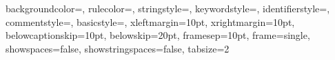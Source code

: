 \setlength{\parindent}{0cm}


 {
	backgroundcolor=\color{codebg},
	rulecolor=\color{codeborder},
	stringstyle=\color{purple},
	keywordstyle=\color{darkblue},
	identifierstyle=\color{lightblue},
	commentstyle=\color{lightgreen},
	basicstyle=\footnotesize\sffamily,
	xleftmargin=10pt,
	xrightmargin=10pt,
	belowcaptionskip=10pt,
	belowskip=20pt,
	framesep=10pt,
	frame=single,
	showspaces=false,
	showstringspaces=false,
	tabsize=2
}

\lstset {
	style=default_style
}

\newcommand{\newpagesection}[1] {
	\clearpage
	\section{#1}
}

\newcommand{\newpagesubsection}[1] {
	\clearpage
	\subsection{#1}
}
